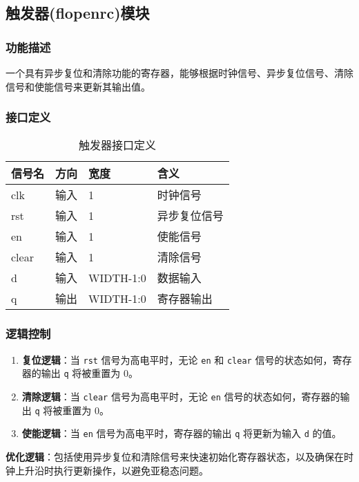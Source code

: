 \subsection{触发器(flopenrc)模块}\label{sub:flopenrc}
\subsubsection{功能描述}
一个具有异步复位和清除功能的寄存器，能够根据时钟信号、异步复位信号、清除信号和使能信号来更新其输出值。
\subsubsection{接口定义}
\begin{table}[htp]
	\caption{触发器接口定义}\label{tab:flopdef}
	\begin{center}
		\begin{tabular}{|l|l|l|p{8cm}|}
		\hline
		\textbf{信号名} & \textbf{方向} & \textbf{宽度} & \textbf{含义}\\ \hline \hline
		clk    & 输入  & 1         & 时钟信号 \\ 
		rst    & 输入  & 1         & 异步复位信号 \\ 
		en     & 输入  & 1         & 使能信号 \\ 
		clear  & 输入  & 1         & 清除信号 \\ 
		d      & 输入  & WIDTH-1:0 & 数据输入 \\ 
		q      & 输出  & WIDTH-1:0 & 寄存器输出 \\ 
		\hline
		\end{tabular}
	\end{center}
	\end{table}
\subsubsection{逻辑控制}
\begin{enumerate}
    \item \textbf{复位逻辑}：当 \texttt{rst} 信号为高电平时，无论 \texttt{en} 和 \texttt{clear} 信号的状态如何，寄存器的输出 \texttt{q} 将被重置为 0。
    \item \textbf{清除逻辑}：当 \texttt{clear} 信号为高电平时，无论 \texttt{en} 信号的状态如何，寄存器的输出 \texttt{q} 将被重置为 0。
    \item \textbf{使能逻辑}：当 \texttt{en} 信号为高电平时，寄存器的输出 \texttt{q} 将更新为输入 \texttt{d} 的值。
\end{enumerate}

\textbf{优化逻辑}：包括使用异步复位和清除信号来快速初始化寄存器状态，以及确保在时钟上升沿时执行更新操作，以避免亚稳态问题。
